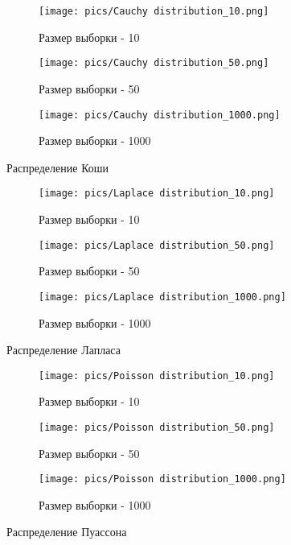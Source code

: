 \documentclass[a4paper, 14pt]{extreport}
\begin{document}
\begin{figure}
    \centering
    \begin{subfigure}[b]{0.5\textwidth}
    \texttt{[image: pics/Cauchy distribution\_10.png]}
    \caption{Размер выборки - 10}
    \end{subfigure}
    
    \begin{subfigure}[b]{0.5\textwidth}
    \texttt{[image: pics/Cauchy distribution\_50.png]}
    \caption{Размер выборки - 50}
    \end{subfigure}
    
    \begin{subfigure}[b]{0.5\textwidth}
    \texttt{[image: pics/Cauchy distribution\_1000.png]}
    \caption{Размер выборки - 1000}
    \end{subfigure}
    \caption{Распределение Коши}
    \label{fig:cauch}
\end{figure}

\begin{figure}
    \centering
    \begin{subfigure}[b]{0.5\textwidth}
    \texttt{[image: pics/Laplace distribution\_10.png]}
    \caption{Размер выборки - 10}
    \end{subfigure}
    
    \begin{subfigure}[b]{0.5\textwidth}
    \texttt{[image: pics/Laplace distribution\_50.png]}
    \caption{Размер выборки - 50}
    \end{subfigure}
    
    \begin{subfigure}[b]{0.5\textwidth}
    \texttt{[image: pics/Laplace distribution\_1000.png]}
    \caption{Размер выборки - 1000}
    \end{subfigure}
    \caption{Распределение Лапласа}
    \label{fig:laplace}
\end{figure}

\begin{figure}
    \centering
    \begin{subfigure}[b]{0.5\textwidth}
    \texttt{[image: pics/Poisson distribution\_10.png]}
    \caption{Размер выборки - 10}
    \end{subfigure}
    
    \begin{subfigure}[b]{0.5\textwidth}
    \texttt{[image: pics/Poisson distribution\_50.png]}
    \caption{Размер выборки - 50}
    \end{subfigure}
    
    \begin{subfigure}[b]{0.5\textwidth}
    \texttt{[image: pics/Poisson distribution\_1000.png]}
    \caption{Размер выборки - 1000}
    \end{subfigure}
    \caption{Распределение Пуассона}
    \label{fig:poisson}
\end{figure}
\end{document}
